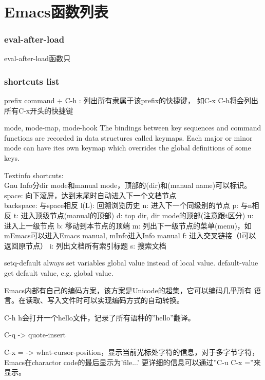 \documentclass[a4paper,11pt]{article}
\begin{document}
  \tt %
  \pagestyle{header}
  \sybmaketitle
  \tableofcontents
  \newpage

  \pagestyle{main}
  \setcounter{page}{1}
  
  \part[Emacs函数列表]{Emacs函数列表}
  \section[eval-after-load]{eval-after-load}
  eval-after-load函数只

  \section[shortcuts list]{shortcuts list}
  prefix command + C-h : 列出所有隶属于该prefix的快捷键，
  如C-x C-h将会列出所有C-x开头的快捷键

  mode, mode-map, mode-hook
  The bindings between key sequences and command functions are recorded in data structures called keymaps.
  Each major or minor mode can have ites own keymap which overrides the global definitions of some keys.

  Textinfo shortcuts:\\
  Gnu Info分dir mode和manual mode，顶部的(dir)和(manual name)可以标识。
  space: 向下滚屏，达到末尾时自动进入下一个文档节点\\
  backspace: 与space相反
  l(L): 回溯浏览历史
  n: 进入下一个同级别的节点
  p: 与n相反
  t: 进入顶级节点(manual的顶部)
  d: top dir, dir mode的顶部(注意跟t区分)
  u: 进入上一级节点
  b: 移动到本节点的顶端
  m: 列出下一级节点的菜单(menu)，如mEmacs可以进入Emacs manual, mInfo进入Info manual
  f: 进入交叉链接（l可以返回原节点）
  i: 列出文档所有索引标题
  s: 搜索文档

  setq-default always set variables global value instead of local value.
  default-value get default value, e.g. global value.

  Emacs内部有自己的编码方案，该方案是Unicode的超集，它可以编码几乎所有
  语言。在读取、写入文件时可以实现编码方式的自动转换。

  C-h h会打开一个hello文件，记录了所有语种的''hello''翻译。

  C-q -> quote-insert

  C-x = -> what-cursor-position，显示当前光标处字符的信息，对于多字节字符，
  Emacs在charactor code的最后显示为'file...'
  更详细的信息可以通过''C-u C-x =''来显示。
\end{document}
